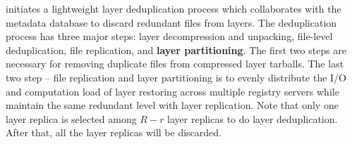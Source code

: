  
 \sysname initiates a lightweight layer deduplication process which collaborates with the metadata database
 to discard redundant files from layers. 
The deduplication process has three major steps: 
layer decompression and unpacking, 
file-level deduplication,
file replication,
and \textbf{layer partitioning}. 
The first two steps are necessary for removing duplicate files from compressed layer tarballs.
The last two step -- file replication and layer partitioning is 
to evenly distribute the I/O and computation load of layer restoring across multiple registry servers 
while maintain the same redundant level with layer replication.  
Note that only one layer replica is selected among $R-r$ layer replicas to do layer deduplication.
After that, all the layer replicas will be discarded.  


%
